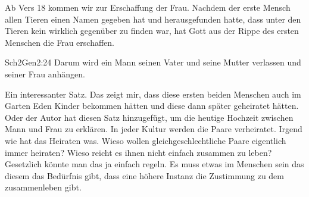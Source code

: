 Ab Vers 18 kommen wir zur Erschaffung der Frau. Nachdem der erste Mensch allen Tieren einen Namen gegeben hat und herausgefunden hatte, dass unter den Tieren kein wirklich gegenüber zu finden war, hat Gott aus der Rippe des ersten Menschen die Frau erschaffen.
\begin{bibeltext}{Sch2}{Gen}{2:24}
	Darum wird ein Mann seinen Vater und seine Mutter verlassen und seiner Frau anhängen.
\end{bibeltext}
Ein interessanter Satz. Das zeigt mir, dass diese ersten beiden Menschen auch im Garten Eden Kinder bekommen hätten und diese dann später geheiratet hätten. Oder der Autor hat diesen Satz hinzugefügt, um die heutige Hochzeit zwischen Mann und Frau zu erklären. In jeder Kultur werden die Paare verheiratet. Irgend wie hat das Heiraten was. Wieso wollen gleichgeschlechtliche Paare eigentlich immer heiraten? Wieso reicht es ihnen nicht einfach zusammen zu leben? Gesetzlich könnte man das ja einfach regeln. Es muss etwas im Menschen sein das diesem das Bedürfnis gibt, dass eine höhere Instanz die Zustimmung zu dem zusammenleben gibt.
